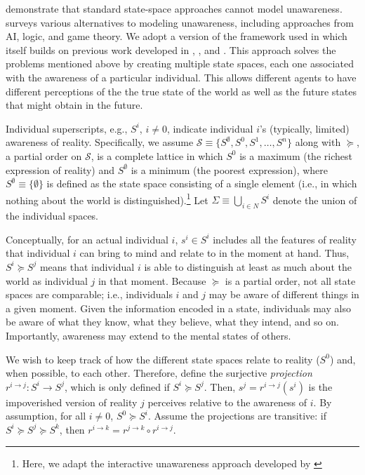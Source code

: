 \documentclass[
11pt,
titlepage,
reqno,
]{article}%
\theoremstyle{definition}
\begin{document}
\citet{Dekel1998} demonstrate that standard state-space approaches cannot model unawareness. \citet{Schipper2015} surveys various alternatives to modeling unawareness, including approaches from  AI, logic, and game theory. We adopt a version of the framework used in   \cite{bryan2020value} which itself builds on previous work developed in \citet{Heifetz2006}, \citet{Heifetz2008}, and \citet{Heifetz2013}. This approach solves the problems mentioned above by creating multiple state spaces, each one associated with the awareness of a particular individual. This allows different agents to have different perceptions of the the true state of the world as well as the future states that might obtain in the future. 

	Individual superscripts, e.g., $S^i$, $i\ne 0$,  indicate individual $i$'s (typically, limited) awareness of reality.
	Specifically, we assume $\mathcal{S}\equiv \{S^\emptyset,S^0,S^1,\ldots,S^n\}$ along with $\succeq$, a partial order on $\mathcal{S}$, is a complete lattice in which $S^0$ is a maximum (the richest expression of reality) and $S^\emptyset$ is a minimum (the poorest expression), where $S^\emptyset\equiv\{\emptyset\}$ is defined as the state space consisting of a single element (i.e., in which nothing about the world is distinguished).\footnote
	{
		Here, we adapt the interactive unawareness approach developed by \cite{Heifetz2006
		}
	}
	Let $\Sigma\equiv\bigcup_{i\in N}S^i$ denote the union of the individual spaces.
	
	Conceptually, for an actual individual $i$, $s^i\in S^i$ includes all the features of reality that individual $i$ can bring to mind and relate to in the moment at hand.
	Thus, $S^i\succeq S^j$ means that individual $i$ is able to distinguish at least as much about the world as individual $j$ in that moment.
	Because $\succeq$ is a partial order, not all state spaces are comparable; i.e., individuals $i$ and $j$ may be aware of different things in a given moment.
	Given the information encoded in a state, individuals may also be aware of what they know, what they believe, what they intend, and so on. 
	Importantly, awareness may extend to the mental states of others. 


	We wish to keep track of how the different state spaces relate to reality ($S^0$) and, when possible, to each other. 
	Therefore, define the surjective \textit{projection} $r^{i\rightarrow j}:S^i\rightarrow S^j$, which is only defined if  $S^i\succeq S^j$.
	Then, $s^j=r^{i\rightarrow j}(s^i)$ is the impoverished version of reality $j$ perceives relative to the awareness of $i$. 
	By assumption, for all $i\ne 0$, $S^0\succeq S^i$.
	Assume the projections are transitive: if $S^i\succeq S^j\succeq S^k$, then $r^{i\rightarrow k}=r^{j\rightarrow k}\circ r^{i\rightarrow j}$.
\end{document}
